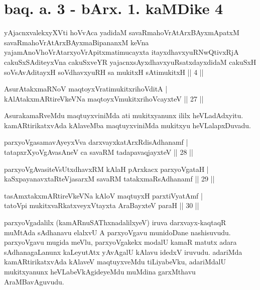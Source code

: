 \section*{baq. a. 3 - bArx. 1. kaMDike 4}

\begin{shl}
yAjacnxvalekxyXVti hoVvAca yadidaM savaRmahoVrAtArxBAyxmApatxM savaRmahoVrAtArxBAyxmaBipananxM keVna yajamAnoV\s hoVrAtarxyoVrApitxmatimucayxta itayxdhavxyuRNwQtivxRjA cakuSxSAditeyxVna cakuSxveYR yajacnxsAyxdhavxyuRsatxdayxdidaM cakuSxH soV\s sAvAditayxH soV\s dhavxyuRH sa mukitxH sAtimukitxH || 4 ||
\end{shl}

\begin{shl}
AsurAtakxmaRNoV maqtoyxVratimukitxrihoVditA |\\
kAlAtakxmARtireVkeVNa maqtoyxVmukitxrihoVcayxteV \hfill || 27 ||
\end{shl}

\begin{artha}
AsurakamaRveMdu maqtuyxviniMda ati mukitxyanunx ililx heVLadAdxyitu. kamARtirikatxvAda kAlaveMba maqtuyxviniMda mukitxyu heVLalapxDuvadu.
\end{artha}


\begin{shl}
parxyoVgasamavAyeyxVva darxvayxkatArxRdisAdhanamf |\\
tatapxrXyoVgAvasAneV ca savaRM tadapavaqjayxteV \hfill || 28 ||
\end{shl}

\begin{shl}
parxyoVgAvasiteVsUtxdhavxRM kAlaH pArxkacx parxyoVgataH |\\
kaSxpayanavxtaRteVjasarxM savaRM tatakxmaRsAdhanamf \hfill || 29 || 
\end{shl}

\begin{shl}
tasAmxtakxmARtireVkeVNa kAloV maqtuyxH parxtiVyatAmf |\\
tatoV\s pi mukitxvaRkatxveyxVtayxta AraBayxteV paraH \hfill || 30 ||
\end{shl}

\begin{artha}
parxyoVgadalilx (kamARnuSAThxnadalilxyeV) iruva darxvayx-kaqtaqR muMtAda sAdhanavu elalxvU A parxyoVgavu munidoDane nashisuvudu. parxyoVgavu mugida meVlu, parxyoVgakekx modalU kamaR matutx adara sAdhanagaLanunx kaLeyutAtx yAvAgalU kAlavu idedxV iruvudu. adariMda kamARtirikatxvAda kAlaveV maqtuyxveMdu tiLiyabeVku, adariMdalU mukitxyanunx heVLabeVkAgideyeMdu muMdina garxMthavu AraMBavAguvudu.
\end{artha}

